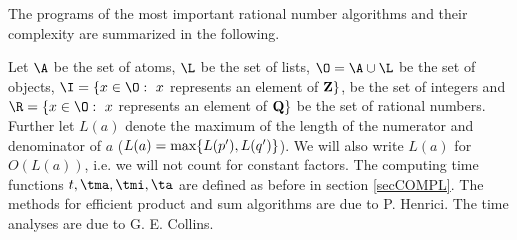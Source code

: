 The programs of the most important rational number algorithms 
and their complexity are summarized in the following.

Let
$\A$ be the set of atoms,
$\L$ be the set of lists,
$\O = \A \cup \L$ be the set of objects,
$\I = \{ x \in \O: \ x$ represents an element of ${\rm \bf Z} \}$, 
be the set of integers and 
$\R = \{ x \in \O: \ x$ represents an element of ${\rm \bf Q} \}$ 
be the set of rational numbers. 
Further let $L(a)$ denote the maximum of the length 
of the numerator and denominator of $a$ 
($L(a) = \mbox{\rm max}\{ L(p'), L(q') \}$).
We will also write $L(a)$ for $O(L(a))$, i.e. we will not count for 
constant factors.
The computing time functions $t, \tma, \tmi, \ta$ 
are defined as before in section \ref{secCOMPL}.
The methods for efficient product and sum algorithms are 
due to P. Henrici.
The time analyses are due to G. E. Collins.

